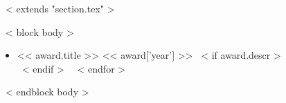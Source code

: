 ~< extends "section.tex" >~

~< block body >~
\begin{itemize}
  ~< for award in items >~
    \item << award.title >> \hfill << award['year'] >>
    ~< if award.descr >~
    \\ \scriptsize{
      \color{gray}{<< award.descr >>}
    }
    ~< endif >~
  ~< endfor >~
\end{itemize}
~< endblock body >~

